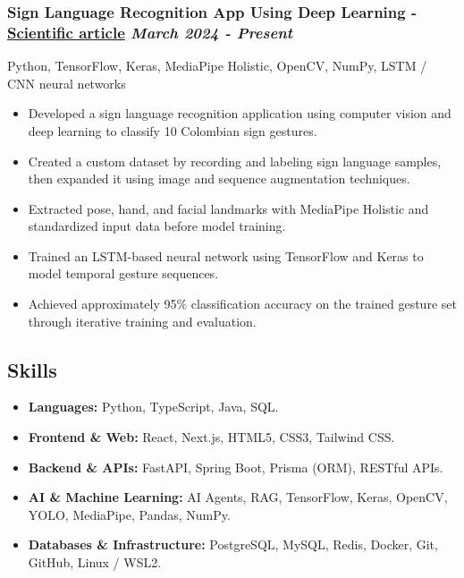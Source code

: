 \documentclass[a4paper,10pt]{article}
\begin{document}
\subsubsection*{%
  \textbf{Sign Language Recognition App Using Deep Learning} - \href{https://bonga.unisimon.edu.co/server/api/core/bitstreams/83c0cc48-143b-40a7-b3c8-34bda57d3a5e/content}{Scientific article}
  \hfill
  \textit{March 2024 - Present}
}
Python, TensorFlow, Keras, MediaPipe Holistic, OpenCV, NumPy, LSTM / CNN neural networks
\begin{itemize}
  \item Developed a sign language recognition application using computer vision and deep 
        learning to classify 10 Colombian sign gestures.
  \item Created a custom dataset by recording and labeling sign language samples, then expanded
        it using image and sequence augmentation techniques.
  \item Extracted pose, hand, and facial landmarks with MediaPipe Holistic and standardized
        input data before model training.
  \item Trained an LSTM-based neural network using TensorFlow and Keras to model temporal 
        gesture sequences.
  \item Achieved approximately 95\% classification accuracy on the trained gesture set through iterative training and evaluation.

\end{itemize}

\subsection*{Skills}
\begin{itemize}[leftmargin=1.5em, itemsep=2pt, parsep=0pt]
  \item \textbf{Languages:} Python, TypeScript, Java, SQL.
  \item \textbf{Frontend \& Web:} React, Next.js, HTML5, CSS3, Tailwind CSS.
  \item \textbf{Backend \& APIs:} FastAPI, Spring Boot, Prisma (ORM), RESTful APIs.
  \item \textbf{AI \& Machine Learning:} AI Agents, RAG, TensorFlow, Keras, OpenCV, YOLO, MediaPipe, Pandas, NumPy.
  \item \textbf{Databases \& Infrastructure:} PostgreSQL, MySQL, Redis, Docker, Git, GitHub, Linux / WSL2.
\end{itemize}
\end{document}
